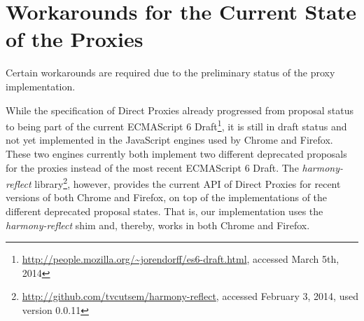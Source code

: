 % 
% 
% 





\section{Workarounds for the Current State of the Proxies} \label{sec:IMPLEMENTATION:4}

Certain workarounds are required due to the preliminary status of the proxy implementation.

While the specification of Direct Proxies already progressed from proposal status to being part of the current ECMAScript 6 Draft\footnote{\url{http://people.mozilla.org/~jorendorff/es6-draft.html}, accessed March 5th, 2014}, it is still in draft status and not yet implemented in the JavaScript engines used by Chrome and Firefox.
These two engines currently both implement two different deprecated proposals for the proxies instead of the most recent ECMAScript 6 Draft.
The \emph{harmony-reflect} library\footnote{\url{http://github.com/tvcutsem/harmony-reflect}, accessed February 3, 2014, used version 0.0.11}, however, provides the current API of Direct Proxies for recent versions of both Chrome and Firefox, on top of the implementations of the different deprecated proposal states.
That is, our implementation uses the \emph{harmony-reflect} shim and, thereby, works in both Chrome and Firefox.

